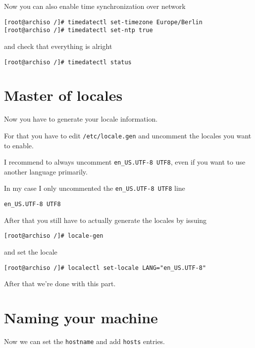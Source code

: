 \documentclass[9pt]{report}
\newenvironment{NOTE}
{\begin{tcolorbox}[colback=admonitionBG,coltitle=draculaFG,colframe=draculaBlue,colbacktitle=draculaBlue,title=NOTE]}
{\end{tcolorbox}}
\begin{document}
Now you can also enable time synchronization over network


\begin{verbatim}
[root@archiso /]# timedatectl set-timezone Europe/Berlin
[root@archiso /]# timedatectl set-ntp true
\end{verbatim}

and check that everything is alright


\begin{verbatim}
[root@archiso /]# timedatectl status
\end{verbatim}


\newpage

\hypertarget{x-master-of-locales}{\section{Master of locales}}
Now you have to generate your locale information.


For that you have to edit \texttt{/etc/locale.gen} and uncomment the locales you want to enable.


\begin{NOTE}
    I recommend to always uncomment \texttt{en\_US.UTF-8 UTF8}, even if you want to use another language primarily.

\end{NOTE}
In my case I only uncommented the \texttt{en\_US.UTF-8 UTF8} line


\begin{verbatim}
en_US.UTF-8 UTF8
\end{verbatim}

After that you still have to actually generate the locales by issuing


\begin{verbatim}
[root@archiso /]# locale-gen
\end{verbatim}

and set the locale


\begin{verbatim}
[root@archiso /]# localectl set-locale LANG="en_US.UTF-8"
\end{verbatim}

After that we’re done with this part.



\newpage

\hypertarget{x-naming-your-machine}{\section{Naming your machine}}
Now we can set the \texttt{hostname} and add \texttt{hosts} entries.
\end{document}
